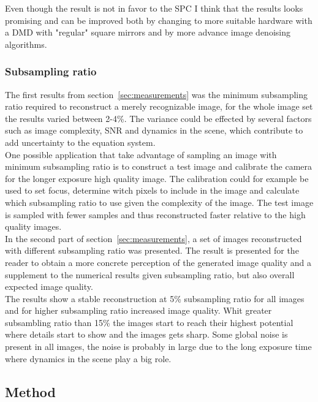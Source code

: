 Even though the result is not in favor to the SPC I think that the results looks promising and can be improved both by changing to more suitable hardware with a DMD with "regular" square mirrors and by more advance image denoising algorithms.

\subsubsection{Subsampling ratio}
The first results from section~\ref{sec:measurements} was the minimum subsampling ratio required to reconstruct a merely recognizable image, for the whole image set the results varied between 2-4\%. The variance could be effected by several factors such as image complexity, SNR and dynamics in the scene, which contribute to add uncertainty to the equation system.\\[0.1in]

One possible application that take advantage of sampling an image with minimum subsampling ratio is to construct a test image and calibrate the camera for the longer exposure high quality image. The calibration could for example be used to set focus, determine witch pixels to include in the image and calculate which subsampling ratio to use given the complexity of the image. The test image is sampled with fewer samples and thus reconstructed faster relative to the high quality images.\\[0.1in]

In the second part of section~\ref{sec:measurements}, a set of images reconstructed with different subsampling ratio was presented. The result is presented for the reader to obtain a more concrete perception of the generated image quality and a supplement to the numerical results given subsampling ratio, but also overall expected image quality.\\[0.1in]

The results show a stable reconstruction at 5\% subsampling ratio for all images and for higher subsampling ratio increased image quality. Whit greater subsambling ratio than 15\% the images start to reach their highest potential where details start to show and the images gets sharp. Some global noise is present in all images, the noise is probably in large due to the long exposure time where dynamics in the scene play a big role. 

\subsection{Method} %

